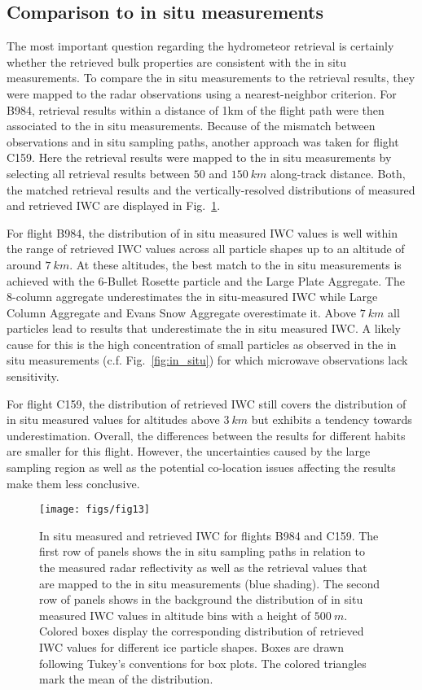 \documentclass[journal abbreviation, manuscript]{copernicus}
\begin{document}
\subsection{Comparison to in situ measurements}

The most important question regarding the hydrometeor retrieval is certainly
whether the retrieved bulk properties are consistent with the in situ
measurements. To compare the in situ measurements to the retrieval results, they
were mapped to the radar observations using a nearest-neighbor criterion. For
B984, retrieval results within a distance of 1km of the flight path were then
associated to the in situ measurements. Because of the mismatch between
observations and in situ sampling paths, another approach was taken for flight
C159. Here the retrieval results were mapped to the in situ measurements by
selecting all retrieval results between $50$ and $150\ \unit{km}$ along-track
distance. Both, the matched retrieval results and the vertically-resolved
distributions of measured and retrieved IWC are displayed in
Fig.~\ref{fig:in_situ_iwc}.

For flight B984, the distribution of in situ measured IWC values is well within
the range of retrieved IWC values across all particle shapes up to an altitude
of around $7\ \unit{km}$. At these altitudes, the best match to the in situ
measurements is achieved with the 6-Bullet Rosette particle and the Large Plate
Aggregate. The 8-column aggregate underestimates the in situ-measured IWC while
Large Column Aggregate and Evans Snow Aggregate overestimate it. Above
$7\ \unit{km}$ all particles lead to results that underestimate the in situ
measured IWC. A likely cause for this is the high concentration of small
particles as observed in the in situ measurements (c.f. Fig.~\ref{fig:in_situ})
for which microwave observations lack sensitivity.

For flight C159, the distribution of retrieved IWC still covers the distribution
of in situ measured values for altitudes above $3\ \unit{km}$ but exhibits a
tendency towards underestimation. Overall, the differences between the results
for different habits are smaller for this flight. However, the uncertainties
caused by the large sampling region as well as the potential co-location issues
affecting the results make them less conclusive.

\begin{figure}[!hbpt]
  \centering
  \texttt{[image: figs/fig13]}
  \caption{In situ measured and retrieved IWC for flights B984 and C159. The
    first row of panels shows the in situ sampling paths in relation to the
    measured radar reflectivity as well as the retrieval values that are mapped
    to the in situ measurements (blue shading). The second row of panels shows
    in the background the distribution of in situ measured IWC values in
    altitude bins with a height of $500\ \unit{m}$. Colored boxes display the
    corresponding distribution of retrieved IWC values for different ice
    particle shapes. Boxes are drawn following Tukey's conventions for box
    plots. The colored triangles mark the mean of the distribution.}
  \label{fig:in_situ_iwc}
\end{figure}
\end{document}
